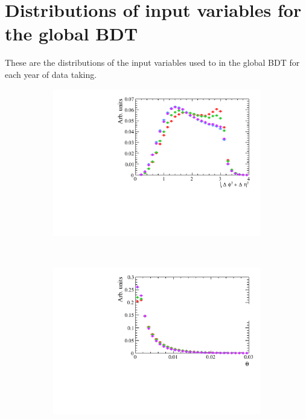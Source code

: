 \chapter{Distributions of input variables for the global BDT}

These are the distributions of the input variables used to in the global BDT for each year of data taking.

\begin{figure}
    \centering
    \begin{subfigure}[b]{0.48\textwidth}
        \includegraphics[width=\textwidth]{./Figs/Selection/signal_deltaR.pdf}
        \caption{ }
        \label{fig:BDTsig}
    \end{subfigure}
    ~ %
    \begin{subfigure}[b]{0.48\textwidth}
       \includegraphics[width=\textwidth]{./Figs/Selection/signal_DIRA.pdf}
        \caption{ }
        \label{fig:BDTbkg}
    \end{subfigure}




\end{figure}
